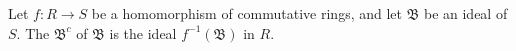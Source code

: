 Let $f : R \to S$ be a homomorphism of commutative rings, and let $\mathfrak{B}$ be an ideal of $S$. The  $\mathfrak{B}^c$ of $\mathfrak{B}$ is the ideal $f^{-1}(\mathfrak{B})$ in $R$.
